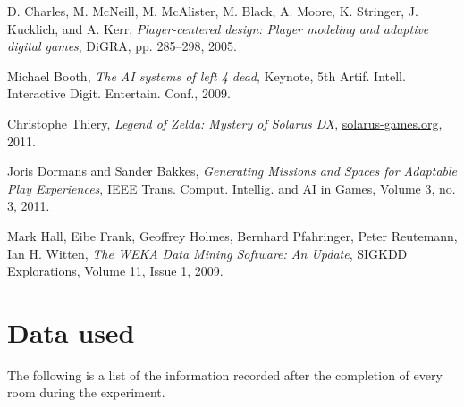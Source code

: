 \documentclass[a4paper]{article}
\begin{document}
\begin{multicols*}{2}
\begin{thebibliography}{9}
D. Charles, M. McNeill, M. McAlister, M. Black, A. Moore, K. Stringer, J. Kucklich, and A. Kerr, 
\emph{Player-centered design: Player modeling and
adaptive digital games},
DiGRA, pp. 285–298,
2005.

Michael Booth,
\emph{The AI systems of left 4 dead},
Keynote, 5th Artif. Intell. Interactive Digit. Entertain. Conf.,
2009.

Christophe Thiery,
\emph{Legend of Zelda: Mystery of Solarus DX},
\url{solarus-games.org},
2011.

Joris Dormans and Sander Bakkes,
\emph{Generating Missions and Spaces for
Adaptable Play Experiences},
{IEEE} Trans. Comput. Intellig. and {AI} in Games, Volume 3, no. 3,
2011.

Mark Hall, Eibe Frank, Geoffrey Holmes, Bernhard Pfahringer, Peter Reutemann, Ian H. Witten,
\emph{The WEKA Data Mining Software: An Update},
SIGKDD Explorations, Volume 11, Issue 1,
2009.

\end{thebibliography}
\end{multicols*}

\clearpage
\appendix
\section{Data used}
The following is a list of the information recorded after the completion of every room during the experiment.
\end{document}
